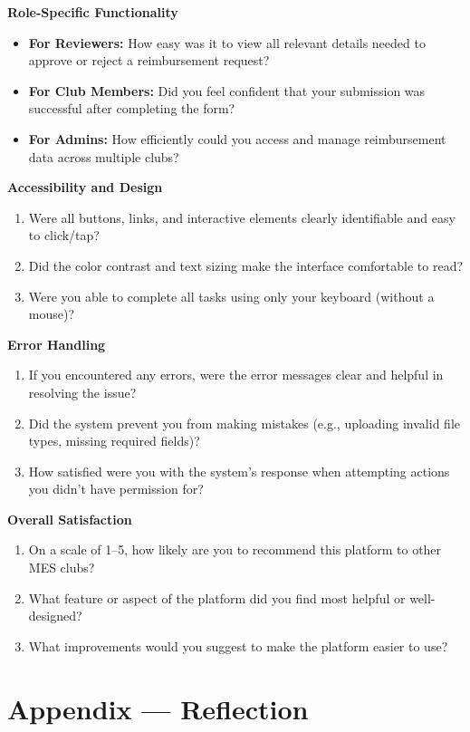 \documentclass[12pt, titlepage]{article}
\begin{document}
  \textbf{Role-Specific Functionality}
  \begin{itemize}
      \item \textbf{For Reviewers:} How easy was it to view all relevant details needed to approve or reject a reimbursement request?
      \item \textbf{For Club Members:} Did you feel confident that your submission was successful after completing the form?
      \item \textbf{For Admins:} How efficiently could you access and manage reimbursement data across multiple clubs?
  \end{itemize}

  \textbf{Accessibility and Design}
  \begin{enumerate}
      \item Were all buttons, links, and interactive elements clearly identifiable and easy to click/tap?
      \item Did the color contrast and text sizing make the interface comfortable to read?
      \item Were you able to complete all tasks using only your keyboard (without a mouse)?
  \end{enumerate}

  \textbf{Error Handling}
  \begin{enumerate}
      \item If you encountered any errors, were the error messages clear and helpful in resolving the issue?
      \item Did the system prevent you from making mistakes (e.g., uploading invalid file types, missing required fields)?
      \item How satisfied were you with the system's response when attempting actions you didn't have permission for?
  \end{enumerate}

  \textbf{Overall Satisfaction}
  \begin{enumerate}
      \item On a scale of 1--5, how likely are you to recommend this platform to other MES clubs?
      \item What feature or aspect of the platform did you find most helpful or well-designed?
      \item What improvements would you suggest to make the platform easier to use?
  \end{enumerate}

\newpage{}
\section*{Appendix --- Reflection}
\end{document}
